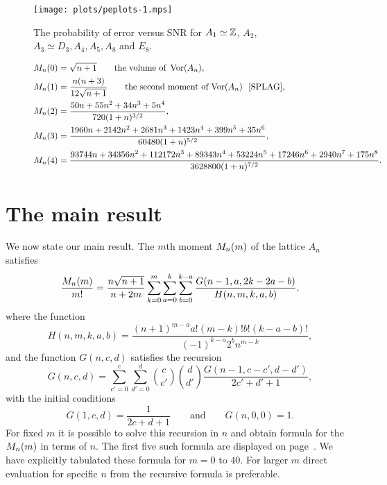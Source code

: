 \documentclass[journal]{IEEEtran}
\begin{document}
\begin{figure*}[htbp]
	\centering
		\texttt{[image: plots/peplots-1.mps]}
		\caption{The probability of error versus SNR for $A_1 \simeq {\mathbb Z}$, $A_2$, $A_3\simeq D_3, A_4, A_5, A_8$ and $E_8$.}
		\label{fig:peplots}
\end{figure*}

\begin{figure*}[htbp]
\begin{equation*} \label{eq:momentsAnformn}
\begin{split}
\calM_n(0) &= \sqrt{n+1} \qquad \text{the volume of } \vor(A_n),
\\ \calM_n(1) &= \frac{n(n+3)}{12\sqrt{n+1}} \qquad \text{the second moment of $\vor(A_n)$~ \cite[p. 462]{SPLAG}}, 
\\ \calM_n(2) &=  \frac{50 n + 55 n^2 + 34 n^3 + 5 n^4}{720 (1 + n)^{3/2}}, 
\\ \calM_n(3) &= \frac{1960 n + 2142 n^2 + 2681 n^3 + 1423 n^4 + 399 n^5 + 35 n^6}{60480 (1 + n)^{5/2}}, 
\\ \calM_n(4) &= \frac{93744 n + 34356 n^2 + 112172 n^3 + 89343 n^4 + 53224 n^5 + 17246 n^6 + 2940 n^7 + 175 n^8}{3628800 (1 + n)^{7/2}}.
\end{split}
\end{equation*}
\end{figure*}


\section{The main result}\label{sec:main-result}

We now state our main result.  The $m$th moment $M_n(m)$ of the lattice $A_n$ satisfies
\begin{equation}\label{eq:theCmformula}
\frac{\calM_n(m)}{m!} = \frac{n\sqrt{n+1}}{n+2m}\sum_{k=0}^{m}\sum_{a =0}^{k}\sum_{b=0}^{k-a} \frac{G(n-1,a,2k - 2a - b)}{H(n,m,k,a,b)},
\end{equation}
where the function
\[
H(n,m,k,a,b) = \frac{(n+1)^{m-a}a!(m-k)!b! (k-a-b)!}{(-1)^{k-a}2^{b} n^{m-k}},
\]
and the function $G(n,c,d)$ satisfies the recursion
\begin{equation}\label{eq:theGrecursion}
G(n,c,d) = \sum_{c'=0}^{c} \sum_{d'=0}^{d} \binom{c}{c'}\binom{d}{d'} \frac{G(n-1,c-c',d-d')}{2c'+d'+1},
\end{equation}
with the initial conditions
\[
G(1,c,d) = \frac{1}{2c+d+1} \qquad \text{and} \qquad G(n,0,0) = 1.
\]
For fixed $m$ it is possible to solve this recursion in $n$ and obtain formula for the $M_n(m)$ in terms of $n$.  The first five such formula are displayed on page~\pageref{eq:momentsAnformn}.  We have explicitly tabulated these formula for $m=0$ to $40$. For larger $m$ direct evaluation for specific $n$ from the recursive formula is preferable.  %
\end{document}
